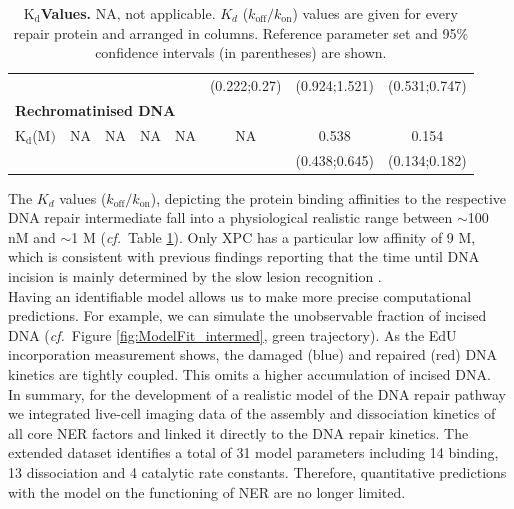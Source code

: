 \begin{landscape}
\begin{table}[t]
{\begin{tabular}[angle=90]{p{2cm}ccccccc}
	&                               &                              &                           &                          &(0.222;0.27)     &  (0.924;1.521)  & (0.531;0.747)  \\
	\multicolumn{8}{l}{\textbf{Rechromatinised DNA}} \\
	$\text{K}_{\text{d}}$({\textmu}$\text{M})$                                                  & NA                          &NA                         & NA                      &NA                      &NA                         &0.538                    &0.154     \\
	&                               &                              &                           &                          &                            &  (0.438;0.645)  & (0.134;0.182)  \\
	\hline
\end{tabular}}

\begin{adjustwidth}{-3.5 cm}{}
\captionsetup{width=1.24\textwidth}
\caption{\textbf{$\text{K}_{\text{d}}$Values.} NA, not applicable. $K_d$ ($k_{\text{off}}/k_{\text{on}}$) values are given for every repair protein and arranged in columns. Reference parameter set and 95\% confidence intervals (in parentheses) are shown.}\label{tab:KdValues}
\end{adjustwidth}
\end{table}

\end{landscape}

The $K_d$ values ($k_{\text{off}}/k_{\text{on}}$), depicting the protein binding affinities to the respective DNA repair intermediate fall into a physiological realistic range between $\sim$100 nM and $\sim$1 \textmu M (\textit{cf.}\ Table \ref{tab:KdValues}). Only XPC has a particular low affinity of 9 \textmu M, which is consistent with previous findings reporting that the time until DNA incision is mainly determined by the slow lesion recognition \cite{Luijsterburg2010}.\\        
Having an identifiable model allows us to make more precise computational predictions. For example, we can simulate the unobservable fraction of incised DNA (\textit{cf.}\ Figure \ref{fig:ModelFit_intermed}, green trajectory). As the EdU incorporation measurement shows, the damaged (blue) and repaired (red) DNA kinetics are tightly coupled. This omits a higher accumulation of incised DNA.\\ 


In summary, for the development of a realistic model of the DNA repair pathway we integrated live-cell imaging data of the assembly and dissociation kinetics of all core NER factors and linked it directly to the DNA repair kinetics. The extended dataset identifies a total of 31 model parameters including 14 binding, 13 dissociation and 4 catalytic rate constants. Therefore, quantitative predictions with the model on the functioning of NER are no longer limited.  

